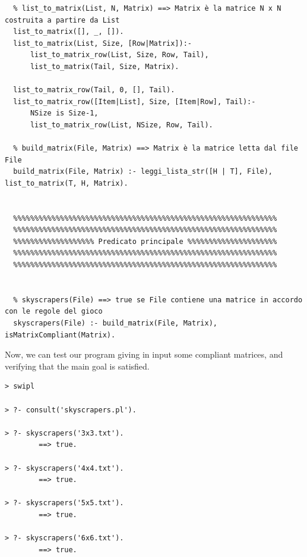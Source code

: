 \documentclass{article}
\begin{document}
\begin{lstlisting}
  % list_to_matrix(List, N, Matrix) ==> Matrix è la matrice N x N costruita a partire da List
  list_to_matrix([], _, []).
  list_to_matrix(List, Size, [Row|Matrix]):-
      list_to_matrix_row(List, Size, Row, Tail),
      list_to_matrix(Tail, Size, Matrix).
  
  list_to_matrix_row(Tail, 0, [], Tail).
  list_to_matrix_row([Item|List], Size, [Item|Row], Tail):-
      NSize is Size-1,
      list_to_matrix_row(List, NSize, Row, Tail).
  
  % build_matrix(File, Matrix) ==> Matrix è la matrice letta dal file File
  build_matrix(File, Matrix) :- leggi_lista_str([H | T], File), list_to_matrix(T, H, Matrix).
  
  
  %%%%%%%%%%%%%%%%%%%%%%%%%%%%%%%%%%%%%%%%%%%%%%%%%%%%%%%%%%%%%%
  %%%%%%%%%%%%%%%%%%%%%%%%%%%%%%%%%%%%%%%%%%%%%%%%%%%%%%%%%%%%%%
  %%%%%%%%%%%%%%%%%%% Predicato principale %%%%%%%%%%%%%%%%%%%%%
  %%%%%%%%%%%%%%%%%%%%%%%%%%%%%%%%%%%%%%%%%%%%%%%%%%%%%%%%%%%%%%
  %%%%%%%%%%%%%%%%%%%%%%%%%%%%%%%%%%%%%%%%%%%%%%%%%%%%%%%%%%%%%%
  
  
  % skyscrapers(File) ==> true se File contiene una matrice in accordo con le regole del gioco
  skyscrapers(File) :- build_matrix(File, Matrix), isMatrixCompliant(Matrix).
\end{lstlisting}

\pagebreak

Now, we can test our program giving in input some compliant matrices, and verifying that the main goal is satisfied.\\

\begin{verbatim}
> swipl

> ?- consult('skyscrapers.pl').

> ?- skyscrapers('3x3.txt').
  		==> true.

> ?- skyscrapers('4x4.txt').
  		==> true.

> ?- skyscrapers('5x5.txt').
  		==> true.

> ?- skyscrapers('6x6.txt').
   		==> true.
\end{verbatim}
\end{document}
